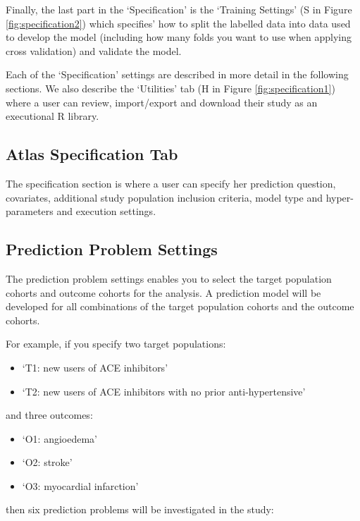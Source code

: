 \documentclass[11pt]{book}
\providecommand{\tightlist}{%
  \setlength{\itemsep}{0pt}\setlength{\parskip}{0pt}}
\begin{document}
Finally, the last part in the `Specification' is the `Training Settings'
(S in Figure \ref{fig:specification2}) which specifies' how to split the
labelled data into data used to develop the model (including how many
folds you want to use when applying cross validation) and validate the
model.

Each of the `Specification' settings are described in more detail in the
following sections. We also describe the `Utilities' tab (H in Figure
\ref{fig:specification1}) where a user can review, import/export and
download their study as an executional R library.

\subsection{Atlas Specification Tab}\label{atlas-specification-tab}

The specification section is where a user can specify her prediction
question, covariates, additional study population inclusion criteria,
model type and hyper-parameters and execution settings.

\subsection{Prediction Problem
Settings}\label{prediction-problem-settings}

The prediction problem settings enables you to select the target
population cohorts and outcome cohorts for the analysis. A prediction
model will be developed for all combinations of the target population
cohorts and the outcome cohorts.

For example, if you specify two target populations:

\begin{itemize}
\tightlist
\item
  `T1: new users of ACE inhibitors'
\item
  `T2: new users of ACE inhibitors with no prior anti-hypertensive'
\end{itemize}

and three outcomes:

\begin{itemize}
\tightlist
\item
  `O1: angioedema'
\item
  `O2: stroke'
\item
  `O3: myocardial infarction'
\end{itemize}

then six prediction problems will be investigated in the study:
\end{document}
